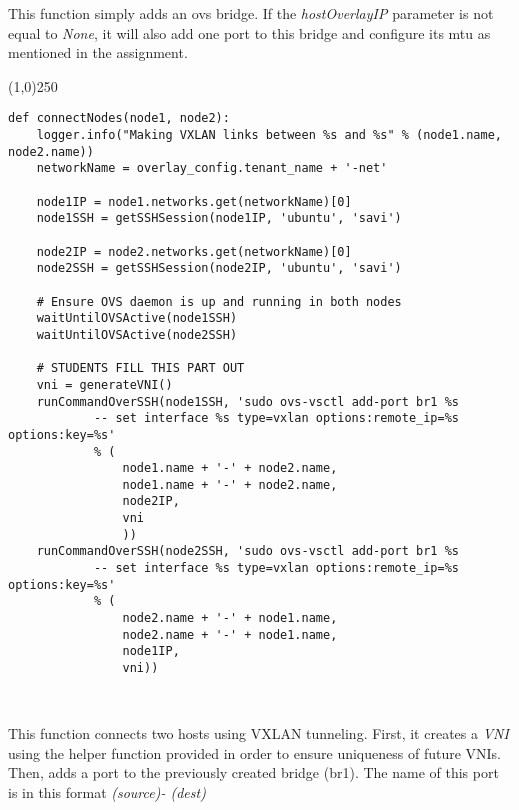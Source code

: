 \documentclass[12pt]{article}
\begin{document}
This function simply adds an ovs bridge. If the \textit{hostOverlayIP} parameter is not equal to \textit{None}, it will also add one port to this bridge and configure its mtu as mentioned in the assignment.

\begin{center}
	\line(1,0){250}
\end{center}
\begin{verbatim}
def connectNodes(node1, node2):
    logger.info("Making VXLAN links between %s and %s" % (node1.name, node2.name))
    networkName = overlay_config.tenant_name + '-net'

    node1IP = node1.networks.get(networkName)[0]
    node1SSH = getSSHSession(node1IP, 'ubuntu', 'savi')

    node2IP = node2.networks.get(networkName)[0]
    node2SSH = getSSHSession(node2IP, 'ubuntu', 'savi')

    # Ensure OVS daemon is up and running in both nodes
    waitUntilOVSActive(node1SSH)
    waitUntilOVSActive(node2SSH)

    # STUDENTS FILL THIS PART OUT
    vni = generateVNI()
    runCommandOverSSH(node1SSH, 'sudo ovs-vsctl add-port br1 %s
            -- set interface %s type=vxlan options:remote_ip=%s options:key=%s'
            % (
                node1.name + '-' + node2.name,
                node1.name + '-' + node2.name,
                node2IP,
                vni
                ))
    runCommandOverSSH(node2SSH, 'sudo ovs-vsctl add-port br1 %s
            -- set interface %s type=vxlan options:remote_ip=%s options:key=%s'
            % (
                node2.name + '-' + node1.name,
                node2.name + '-' + node1.name,
                node1IP,
                vni))



\end{verbatim}

This function connects two hosts using VXLAN tunneling. First, it creates a \textit{VNI} using the helper function provided in order to ensure uniqueness of future VNIs. Then, adds a port to the previously created bridge (br1). The name of this port is in this format \textit{(source)- (dest)}
\end{document}
